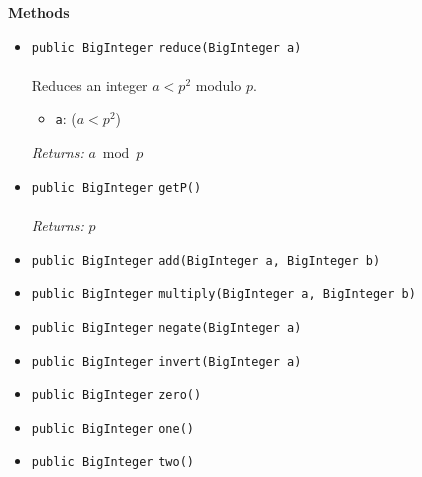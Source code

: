 \textbf{\sffamily Methods}
\begin{itemize}
\item \lstinline|public BigInteger| \lstinline|reduce|\lstinline|(BigInteger a)|\\ \\[-0.6em]
Reduces an integer $a < p^2$ modulo $p$.
\begin{itemize}
\item \lstinline|a|: ($a < p^2$)
\end{itemize}

\emph{Returns:} $a \bmod{p}$

\item \lstinline|public BigInteger| \lstinline|getP|\lstinline|()|\\ \\[-0.6em]
\emph{Returns:} $p$



\item \lstinline|public BigInteger| \lstinline|add|\lstinline|(BigInteger a, BigInteger b)| \\[-0.6em]




\item \lstinline|public BigInteger| \lstinline|multiply|\lstinline|(BigInteger a, BigInteger b)| \\[-0.6em]




\item \lstinline|public BigInteger| \lstinline|negate|\lstinline|(BigInteger a)| \\[-0.6em]




\item \lstinline|public BigInteger| \lstinline|invert|\lstinline|(BigInteger a)| \\[-0.6em]




\item \lstinline|public BigInteger| \lstinline|zero|\lstinline|()| \\[-0.6em]




\item \lstinline|public BigInteger| \lstinline|one|\lstinline|()| \\[-0.6em]




\item \lstinline|public BigInteger| \lstinline|two|\lstinline|()| \\[-0.6em]





\end{itemize}
